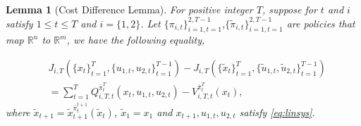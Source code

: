 \documentclass[letterpaper, 10 pt, conference]{ieeeconf}  %
\newtheorem{lemma}{Lemma}
\begin{document}
\begin{lemma}[Cost Difference Lemma]\label{lemma:costDifference}
For positive integer $T$, suppose for $t$ and $i$ satisfy $1 \leq t \leq T$ and $i = \{1,2\}$. Let 
$\{\pi_{i,t}\}_{i=1,t=1}^{2,T-1}$,$\{\tilde{\pi}_{i,t}\}_{i=1,t=1}^{2,T-1}$ are policies that map $\mathbb{R}^{n}$ to $\mathbb{R}^{m}$, we have the following equality,


\begin{align*}
    &J_{i,T}(\{x_{t}\}_{t=1}^{T},\{u_{1,t},u_{2,t}\}_{t=1}^{T-1}) - J_{i,T}(\{\tilde{x}_{t}\}_{t=1}^{T},\{\tilde{u}_{1,t},\tilde{u}_{2,t}\}_{t=1}^{T-1})\\
    &= \sum_{t=1}^{T} Q_{i,T,t}^{\bar{\pi}_{t}^{T}}(x_{t},u_{1,t},u_{2,t}) -  V_{i,T,t}^{\bar{\pi}_{t}^{T}}(x_{t}),
\end{align*}
where $\tilde{x}_{t+1} = \tilde{x}_{t+1}^{\bar{\pi}_{t}^{t+1}}(\tilde{x}_{t})$, $\tilde{x}_{1} = x_{1}$ and $x_{t+1},u_{1,t},u_{2,t}$ satisfy \eqref{eq:linsys}.
\end{lemma}
\end{document}
